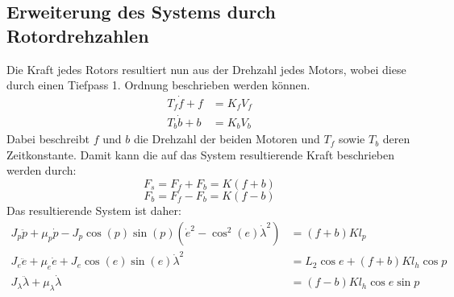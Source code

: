 \documentclass{article}
\begin{document}
	\subsection{Erweiterung des Systems durch Rotordrehzahlen}
	Die Kraft jedes Rotors resultiert nun aus der Drehzahl jedes Motors, wobei diese durch einen Tiefpass 1. Ordnung beschrieben werden können.
	\begin{align}
	T_f \dot{f} + f &= K_f V_f\\
	T_b \dot{b} + b &= K_b V_b
	\end{align}
	Dabei beschreibt $f$ und $b$ die Drehzahl der beiden Motoren und $T_f$ sowie $T_b$ deren Zeitkonstante.
	Damit kann die auf das System resultierende Kraft beschrieben werden durch:
	\begin{equation}
	F_s = F_f + F_b = K (f + b)
	\end{equation}
	\begin{equation}
	F_b = F_f - F_b = K (f - b)
	\end{equation}
	Das resultierende System ist daher:
	\begin{align}
	J_p \ddot{p} + \mu_p \dot{p} - J_p \cos (p) \sin (p) (\dot{e}^2- \cos^2 (e) \dot{\lambda}^2) &= (f + b) K l_p\\
	J_e\ddot{e} + \mu_e \dot{e} + J_e \cos (e) \sin (e) \dot{\lambda}^2 
	&= L_2 \cos e + (f + b) K l_h \cos p\\
	J_\lambda \ddot{\lambda} + \mu_\lambda \dot{\lambda} &= (f - b) K l_h \cos e \sin p
	\end{align}
	
\end{document}
